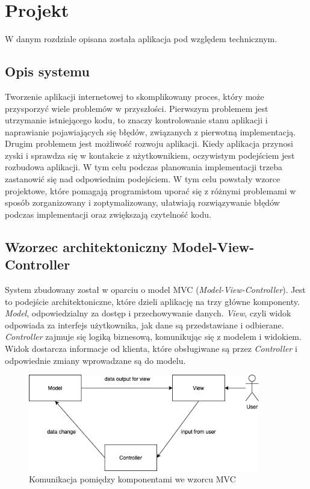 \chapter{Projekt}
\thispagestyle{chapterBeginStyle}
W danym rozdziale opisana została aplikacja pod względem technicznym. 

\section{Opis systemu}
Tworzenie aplikacji internetowej to skomplikowany proces, który może przysporzyć wiele problemów w przyszłości. Pierwszym problemem jest utrzymanie istniejącego kodu, to znaczy kontrolowanie stanu aplikacji i naprawianie pojawiających się błędów, związanych z pierwotną implementacją. Drugim problemem jest możliwość rozwoju aplikacji. Kiedy aplikacja przynosi zyski i sprawdza się w kontakcie z użytkownikiem, oczywistym podejściem jest rozbudowa aplikacji. W tym celu podczas planowania implementacji trzeba zastanowić się nad odpowiednim podejściem. W tym celu powstały wzorce projektowe, które pomagają programistom uporać się z różnymi problemami w sposób zorganizowany i zoptymalizowany, ułatwiają rozwiązywanie błędów podczas implementacji oraz zwiększają czytelność kodu.

\section{Wzorzec architektoniczny Model-View-Controller}
System zbudowany został w oparciu o model MVC (\textit{Model-View-Controller}).
Jest to podejście architektoniczne, które dzieli aplikację na trzy główne komponenty.
\textit{Model}, odpowiedzialny za dostęp i przechowywanie danych. \textit{View}, czyli widok odpowiada za interfejs użytkownika, jak dane są przedstawiane i odbierane. \textit{Controller} zajmuje się logiką biznesową, komunikując się z modelem i widokiem. Widok dostarcza informacje od klienta, które obsługiwane są przez \textit{Controller} i odpowiednie zmiany wprowadzane są do modelu. \cite{6827095}

\begin{figure}[h]
	
	\centering
	\includegraphics[width=0.90\textwidth]{mvc-diagram}		
	\caption{Komunikacja pomiędzy komponentami we wzorcu MVC }
\end{figure}

